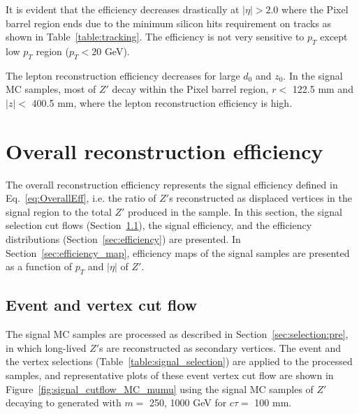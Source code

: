 It is evident that the efficiency decreases drastically at $|\eta| > 2.0$ where the Pixel barrel region ends due to the minimum silicon hits requirement on tracks as shown in Table~\ref{table:tracking}. The efficiency is not very sensitive to $p_{T}$ except low $p_{T}$ region ($p_{T} < 20$ GeV).

The lepton reconstruction efficiency decreases for large $d_{0}$ and $z_{0}$. In the signal MC samples, most of $Z'$ decay within the Pixel barrel region, $r < $ 122.5 mm and $|z| < $ 400.5 mm, where the lepton reconstruction efficiency is high.

\section{Overall reconstruction efficiency}
\label{sec:combined_reco_efficiency}
The overall reconstruction efficiency represents the signal efficiency defined in Eq.~\ref{eq:OverallEff}, i.e. the ratio of $Z'$s reconstructed as displaced vertices in the signal region to the total $Z'$ produced in the sample. In this section, the signal selection cut flows (Section~\ref{sec:signal_cutflow}), the signal efficiency, and the efficiency distributions (Section~\ref{sec:efficiency}) are presented. In Section~\ref{sec:efficiency_map}, efficiency maps of the signal samples are presented as a function of $p_{T}$ and $|\eta|$ of $Z'$.

\subsection{Event and vertex cut flow}
\label{sec:signal_cutflow}
The signal MC samples are processed as described in Section~\ref{sec:selection:pre}, in which long-lived $Z'$s are reconstructed as secondary vertices. The event and the vertex selections (Table~\ref{table:signal_selection}) are applied to the processed samples, and representative plots of these event vertex cut flow are shown in Figure~\ref{fig:signal_cutflow_MC_mumu} using the signal MC samples of $Z'$ decaying to \mumu generated with $m=$ 250, 1000 GeV for $c\tau=$ 100 mm.

